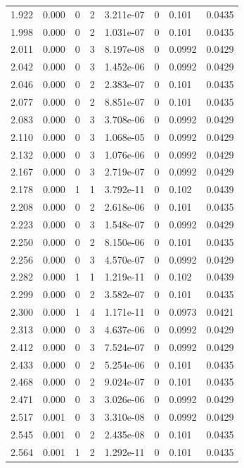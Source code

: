 \documentclass[preview]{standalone}
\begin{document}
{{{\begin{tabular}{L{1.2cm}C{1.2cm} C{0.3cm}C{0.5cm} C{1.4cm}C{1.4cm} C{1.4cm}C{1.4cm}}
  1.922  &  0.000  & 0     &  2 &  3.211e-07  & 0  & 0.101 &  0.0435   \\ 
  1.998  &  0.000  & 0     &  2 &  1.031e-07  & 0  & 0.101 &  0.0435   \\ 
  2.011  &  0.000  & 0     &  3 &  8.197e-08  & 0  & 0.0992 &  0.0429   \\ 
  2.042  &  0.000  & 0     &  3 &  1.452e-06  & 0  & 0.0992 &  0.0429   \\ 
  2.046  &  0.000  & 0     &  2 &  2.383e-07  & 0  & 0.101 &  0.0435   \\ 
  2.077  &  0.000  & 0     &  2 &  8.851e-07  & 0  & 0.101 &  0.0435   \\ 
  2.083  &  0.000  & 0     &  3 &  3.708e-06  & 0  & 0.0992 &  0.0429   \\ 
  2.110  &  0.000  & 0     &  3 &  1.068e-05  & 0  & 0.0992 &  0.0429   \\ 
  2.132  &  0.000  & 0     &  3 &  1.076e-06  & 0  & 0.0992 &  0.0429   \\ 
  2.167  &  0.000  & 0     &  3 &  2.719e-07  & 0  & 0.0992 &  0.0429   \\ 
  2.178  &  0.000  & 1     &  1 &  3.792e-11  & 0  & 0.102 &  0.0439   \\ 
  2.208  &  0.000  & 0     &  2 &  2.618e-06  & 0  & 0.101 &  0.0435   \\ 
  2.223  &  0.000  & 0     &  3 &  1.548e-07  & 0  & 0.0992 &  0.0429   \\ 
  2.250  &  0.000  & 0     &  2 &  8.150e-06  & 0  & 0.101 &  0.0435   \\ 
  2.256  &  0.000  & 0     &  3 &  4.570e-07  & 0  & 0.0992 &  0.0429   \\ 
  2.282  &  0.000  & 1     &  1 &  1.219e-11  & 0  & 0.102 &  0.0439   \\ 
  2.299  &  0.000  & 0     &  2 &  3.582e-07  & 0  & 0.101 &  0.0435   \\ 
  2.300  &  0.000  & 1     &  4 &  1.171e-11  & 0  & 0.0973 &  0.0421   \\ 
  2.313  &  0.000  & 0     &  3 &  4.637e-06  & 0  & 0.0992 &  0.0429   \\ 
  2.412  &  0.000  & 0     &  3 &  7.524e-07  & 0  & 0.0992 &  0.0429   \\ 
  2.433  &  0.000  & 0     &  2 &  5.254e-06  & 0  & 0.101 &  0.0435   \\ 
  2.468  &  0.000  & 0     &  2 &  9.024e-07  & 0  & 0.101 &  0.0435   \\ 
  2.471  &  0.000  & 0     &  3 &  3.026e-06  & 0  & 0.0992 &  0.0429   \\ 
  2.517  &  0.001  & 0     &  3 &  3.310e-08  & 0  & 0.0992 &  0.0429   \\ 
  2.545  &  0.001  & 0     &  2 &  2.435e-08  & 0  & 0.101 &  0.0435   \\ 
  2.564  &  0.001  & 1     &  2 &  1.292e-11  & 0  & 0.101 &  0.0435   \\ 
\hline 
\end{tabular} 

}}}
\end{document}
